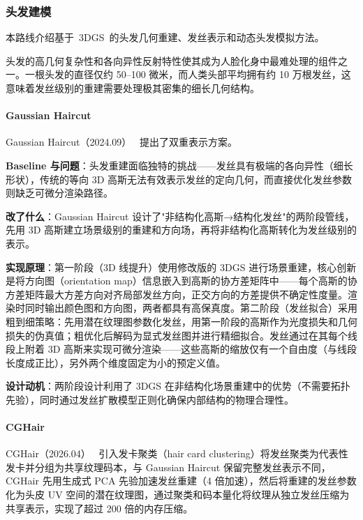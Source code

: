 \subsubsection{头发建模}

本路线介绍基于~3DGS~的头发几何重建、发丝表示和动态头发模拟方法。

头发的高几何复杂性和各向异性反射特性使其成为人脸化身中最难处理的组件之一。一根头发的直径仅约 50--100 微米，而人类头部平均拥有约 10 万根发丝，这意味着发丝级别的重建需要处理极其密集的细长几何结构。

\paragraph{Gaussian Haircut}

Gaussian Haircut（2024.09）~\cite{2409_14778} 提出了双重表示方案。

\textbf{Baseline 与问题}：头发重建面临独特的挑战——发丝具有极端的各向异性（细长形状），传统的等向 3D 高斯无法有效表示发丝的定向几何，而直接优化发丝参数则缺乏可微分渲染路径。

\textbf{改了什么}：Gaussian Haircut 设计了"非结构化高斯→结构化发丝"的两阶段管线，先用 3D 高斯建立场景级别的重建和方向场，再将非结构化高斯转化为发丝级别的表示。

\textbf{实现原理}：第一阶段（3D 线提升）使用修改版的 3DGS 进行场景重建，核心创新是将方向图（orientation map）信息嵌入到高斯的协方差矩阵中——每个高斯的协方差矩阵最大方差方向对齐局部发丝方向，正交方向的方差提供不确定性度量。渲染时同时输出颜色图和方向图，两者都具有高保真度。第二阶段（发丝拟合）采用粗到细策略：先用潜在纹理图参数化发丝，用第一阶段的高斯作为光度损失和几何损失的伪真值；粗优化后解码为显式发丝图并进行精细拟合。发丝通过在其每个线段上附着 3D 高斯来实现可微分渲染——这些高斯的缩放仅有一个自由度（与线段长度成正比），另外两个维度固定为小的预定义值。

\textbf{设计动机}：两阶段设计利用了 3DGS 在非结构化场景重建中的优势（不需要拓扑先验），同时通过发丝扩散模型正则化确保内部结构的物理合理性。

\paragraph{CGHair}

CGHair（2026.04）~\cite{2604_03716} 引入发卡聚类（hair card clustering）将发丝聚类为代表性发卡并分组为共享纹理码本，与 Gaussian Haircut 保留完整发丝表示不同，CGHair 先用生成式 PCA 先验加速发丝重建（4 倍加速），然后将重建的发丝参数化为头皮 UV 空间的潜在纹理图，通过聚类和码本量化将纹理从独立发丝压缩为共享表示，实现了超过 200 倍的内存压缩。

